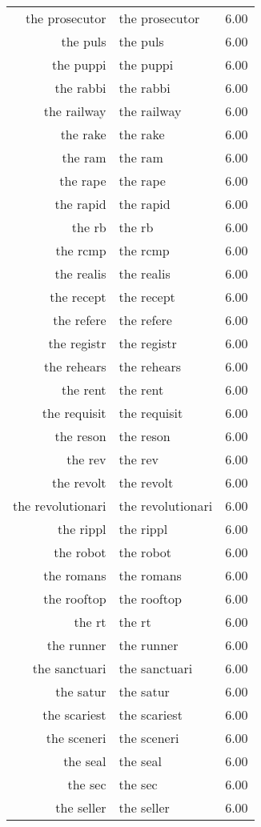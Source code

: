 \begin{table}[ht]
\begin{tabular}{rlr}
  the prosecutor & the prosecutor & 6.00 \\ 
  the puls & the puls & 6.00 \\ 
  the puppi & the puppi & 6.00 \\ 
  the rabbi & the rabbi & 6.00 \\ 
  the railway & the railway & 6.00 \\ 
  the rake & the rake & 6.00 \\ 
  the ram & the ram & 6.00 \\ 
  the rape & the rape & 6.00 \\ 
  the rapid & the rapid & 6.00 \\ 
  the rb & the rb & 6.00 \\ 
  the rcmp & the rcmp & 6.00 \\ 
  the realis & the realis & 6.00 \\ 
  the recept & the recept & 6.00 \\ 
  the refere & the refere & 6.00 \\ 
  the registr & the registr & 6.00 \\ 
  the rehears & the rehears & 6.00 \\ 
  the rent & the rent & 6.00 \\ 
  the requisit & the requisit & 6.00 \\ 
  the reson & the reson & 6.00 \\ 
  the rev & the rev & 6.00 \\ 
  the revolt & the revolt & 6.00 \\ 
  the revolutionari & the revolutionari & 6.00 \\ 
  the rippl & the rippl & 6.00 \\ 
  the robot & the robot & 6.00 \\ 
  the romans & the romans & 6.00 \\ 
  the rooftop & the rooftop & 6.00 \\ 
  the rt & the rt & 6.00 \\ 
  the runner & the runner & 6.00 \\ 
  the sanctuari & the sanctuari & 6.00 \\ 
  the satur & the satur & 6.00 \\ 
  the scariest & the scariest & 6.00 \\ 
  the sceneri & the sceneri & 6.00 \\ 
  the seal & the seal & 6.00 \\ 
  the sec & the sec & 6.00 \\ 
  the seller & the seller & 6.00 \\ 

\end{tabular}
\end{table}
